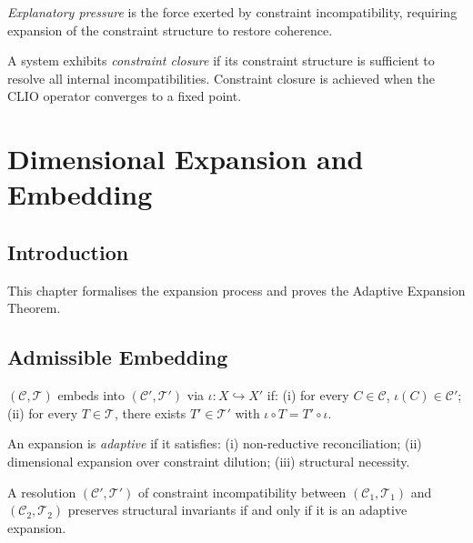 \documentclass[11pt,openany]{book}
\begin{document}
\begin{definition}
\label{def:pressure}
\emph{Explanatory pressure} is the force exerted by
constraint incompatibility, requiring expansion of the
constraint structure to restore coherence.
\end{definition}

\begin{definition}
\label{def:closure}
A system exhibits \emph{constraint closure} if its
constraint structure is sufficient to resolve all internal
incompatibilities. Constraint closure is achieved when the
CLIO operator converges to a fixed point.
\end{definition}


\chapter{Dimensional Expansion and Embedding}
\label{ch:expansion}

\section{Introduction}
\label{sec:introduction-expansion}

This chapter formalises the expansion process and proves
the Adaptive Expansion Theorem.

\section{Admissible Embedding}
\label{sec:embedding-revisited}

\begin{definition}
\label{def:embedding-refined}
$(\mathcal{C}, \mathcal{T})$ embeds into $(\mathcal{C}',
\mathcal{T}')$ via $\iota : X \hookrightarrow X'$ if: (i)
for every $C \in \mathcal{C}$, $\iota(C) \in \mathcal{C}'$;
(ii) for every $T \in \mathcal{T}$, there exists $T' \in
\mathcal{T}'$ with $\iota \circ T = T' \circ \iota$.
\end{definition}

\begin{definition}
\label{def:adaptive-expansion}
An expansion is \emph{adaptive} if it satisfies: (i)
non-reductive reconciliation; (ii) dimensional expansion
over constraint dilution; (iii) structural necessity.
\end{definition}

\begin{theorem}
\label{thm:adaptive-expansion}
A resolution $(\mathcal{C}', \mathcal{T}')$ of constraint
incompatibility between $(\mathcal{C}_1, \mathcal{T}_1)$
and $(\mathcal{C}_2, \mathcal{T}_2)$ preserves structural
invariants if and only if it is an adaptive expansion.
\end{theorem}
\end{document}
